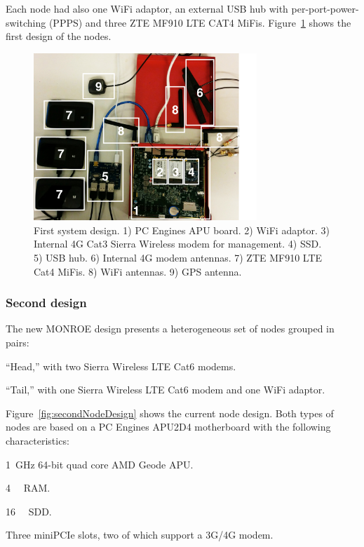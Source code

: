 \documentclass[a4paper,10pt]{article}
\newcommand{\monroe}{MONROE}
\begin{document}
Each node had also one WiFi adaptor, an external USB hub with per-port-power-switching (PPPS) and three ZTE MF910 LTE CAT4 MiFis.
Figure~\ref{fig:firstNodeDesign} shows the first design of the nodes.

\begin{figure}[tp]
	\centering
	\includegraphics[width=0.75\textwidth]{SystemPicture1.png}
	\caption{First system design. 1) PC Engines APU board. 2) WiFi adaptor. 3) Internal 4G Cat3 Sierra Wireless modem for management. 4) SSD. 5) USB hub. 6) Internal 4G modem antennas. 7) ZTE MF910 LTE Cat4 MiFis. 8) WiFi antennas. 9) GPS antenna.}
	\label{fig:firstNodeDesign}
\end{figure}

\subsubsection{Second design}

The new \monroe{} design presents a heterogeneous set of nodes grouped in pairs:
\begin{itemize*}
	\item ``Head,'' with two Sierra Wireless LTE Cat6 modems.
	\item ``Tail,'' with one Sierra Wireless LTE Cat6 modem and one WiFi adaptor.
\end{itemize*}
Figure~\ref{fig:secondNodeDesign} shows the current node design.
Both types of nodes are based on a PC Engines APU2D4 motherboard with the following characteristics:
\begin{itemize*}
	\item \SI{1}{\giga\hertz} 64-bit quad core AMD Geode APU.
	\item \SI{4}{\gibi\byte} RAM.
	\item \SI{16}{\gibi\byte} SDD.
	\item Three miniPCIe slots, two of which support a 3G/4G modem.
\end{itemize*}
\end{document}

